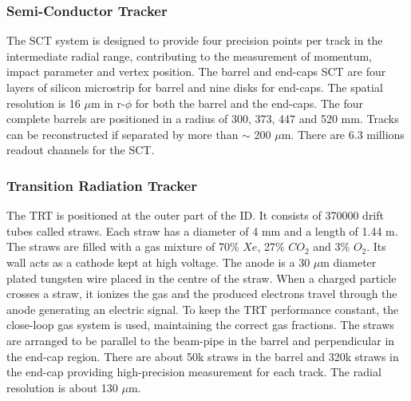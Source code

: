 \subsubsection{Semi-Conductor Tracker}
\label{chap2:ATLAS:ITK:SCT}
The SCT system is designed to provide four precision points per track in the intermediate radial range, contributing to the measurement of momentum, impact parameter and vertex position. The barrel and end-caps SCT are four layers of silicon microstrip for barrel and nine disks for end-caps. The spatial resolution is 16 $\mu$m in r-$\phi$ for both the barrel and the end-caps. The four complete barrels are positioned in a radius of 300, 373, 447 and 520 mm. Tracks can be reconstructed if separated by more than $\sim$ 200 $\mu$m. There are 6.3 millions readout channels for the SCT.

\subsubsection{Transition Radiation Tracker}
The TRT is positioned at the outer part of the ID. It consists of 370000 drift tubes called straws. Each straw has a diameter of 4 mm and a length of 1.44 m. The straws are filled with a gas mixture of 70\% $Xe$, 27\% $CO_2$ and 3\% $O_2$. Its wall acts as a cathode kept at high voltage. The anode is a 30 $\mu$m diameter plated tungsten wire placed in the centre of the straw. When a charged particle crosses a straw, it ionizes the gas and the produced electrons travel through the anode generating an electric signal. To keep the TRT performance constant, the close-loop gas system is used, maintaining the correct gas fractions. The straws are arranged to be parallel to the beam-pipe in the barrel and perpendicular in the end-cap region. There are about 50k straws in the barrel and 320k straws in the end-cap providing high-precision measurement for each track. The radial resolution is about 130 $\mu$m. \\

